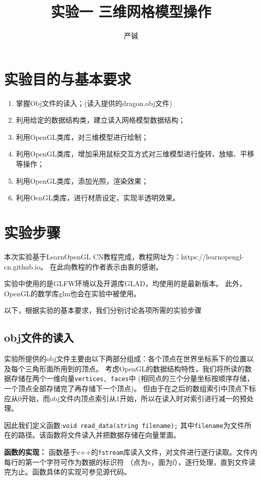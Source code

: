 \documentclass[UTF8]{ctexart}
\title{实验一 \quad 三维网格模型操作 }
\date{}
\author{严铖 \quad 517021910823}
\begin{document}
\maketitle

\section{实验目的与基本要求}

\begin{enumerate}
    \item 掌握Obj文件的读入；(读入提供的dragon.obj文件)
    \item 利用给定的数据结构类，建立读入网格模型数据结构；
    \item 利用OpenGL类库，对三维模型进行绘制；
    \item 利用OpenGL类库，增加采用鼠标交互方式对三维模型进行旋转、放缩、平移等操作；
    \item 利用OpenGL类库，添加光照，渲染效果；
    \item 利用OenGL类库，进行材质设定，实现半透明效果。
\end{enumerate}

\section{实验步骤}
\par
本次实验基于LearnOpenGL CN教程完成，教程网址为：https://learnopengl-cn.github.io。
在此向教程的作者表示由衷的感谢。
\par
实验中使用的是GLFW环境以及开源库GLAD，均使用的是最新版本。
此外，OpenGL的数学库glm也会在实验中被使用。
\par
以下，根据实验的基本要求，我们分别讨论各项所需的实验步骤

\subsection{obj文件的读入}
\par
实验所提供的obj文件主要由以下两部分组成：各个顶点在世界坐标系下的位置以及每个三角形面所用到的顶点。
考虑OpenGL的数据结构特性，我们将所读的数据存储在两个一维向量\verb|vertices, faces|中
(相同点的三个分量坐标按顺序存储，一个顶点全部存储完了再存储下一个顶点)。
但由于在之后的数组索引中顶点下标应从0开始，而obj文件内顶点索引从1开始，所以在读入时对索引进行减一的预处理。
\par
因此我们定义函数:\verb|void read_data(string filename);|
其中\verb|filename|为文件所在的路径。该函数将文件读入并把数据存储在向量里面。
\par
\textbf{函数的实现：}
函数基于c++的\verb|fstream|库读入文件，对文件进行逐行读取。文件内每行的第一个字符可作为数据的标识符
（点为v，面为f），逐行处理，直到文件读完为止。函数具体的实现可参见源代码。
\end{document}
